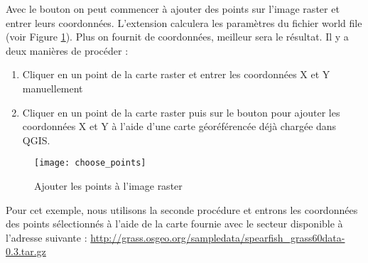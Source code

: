 Avec le bouton  on peut commencer à ajouter des points sur l'image raster et entrer leurs coordonnées. L'extension calculera les paramètres du fichier world file (voir Figure \ref{fig:choose_points}).
Plus on fournit de coordonnées, meilleur sera le résultat.
Il y a deux manières de procéder :


\begin{enumerate}
\item Cliquer en un point de la carte raster et entrer les coordonnées X et Y manuellement
\item Cliquer en un point de la carte raster puis sur le bouton  pour ajouter les coordonnées X et Y à l'aide d'une carte géoréférencée déjà chargée dans QGIS.
\end{enumerate}


\begin{figure}[ht]
\begin{center}
  \caption{Ajouter les points à l'image raster \nixcaption}\label{fig:choose_points}\smallskip
  \texttt{[image: choose\_points]}
\end{center}
\end{figure}


Pour cet exemple, nous utilisons la seconde procédure et entrons les coordonnées des points sélectionnés à l'aide de la carte  fournie avec le secteur  disponible à l'adresse suivante : \url{http://grass.osgeo.org/sampledata/spearfish\_grass60data-0.3.tar.gz}

